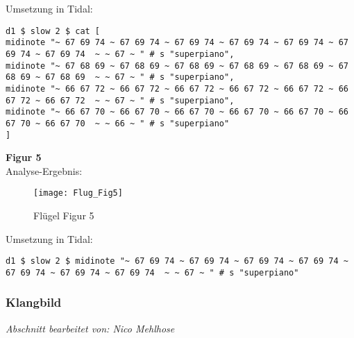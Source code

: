 \documentclass[
10pt, %
a4paper, %
oneside, %
headinclude,footinclude, %
BCOR5mm, %
]{scrartcl}
\begin{document}
\noindent Umsetzung in Tidal:
\begin{lstlisting}
d1 $ slow 2 $ cat [
midinote "~ 67 69 74 ~ 67 69 74 ~ 67 69 74 ~ 67 69 74 ~ 67 69 74 ~ 67 69 74 ~ 67 69 74  ~ ~ 67 ~ " # s "superpiano",
midinote "~ 67 68 69 ~ 67 68 69 ~ 67 68 69 ~ 67 68 69 ~ 67 68 69 ~ 67 68 69 ~ 67 68 69  ~ ~ 67 ~ " # s "superpiano",
midinote "~ 66 67 72 ~ 66 67 72 ~ 66 67 72 ~ 66 67 72 ~ 66 67 72 ~ 66 67 72 ~ 66 67 72  ~ ~ 67 ~ " # s "superpiano",
midinote "~ 66 67 70 ~ 66 67 70 ~ 66 67 70 ~ 66 67 70 ~ 66 67 70 ~ 66 67 70 ~ 66 67 70  ~ ~ 66 ~ " # s "superpiano"
]
\end{lstlisting}

\noindent \textbf{Figur 5}\\
Analyse-Ergebnis:
\begin{figure}[h]
	\centering 
	\texttt{[image: Flug\_Fig5]} 
	\caption{Flügel Figur 5}
\end{figure}

\noindent Umsetzung in Tidal:
\begin{lstlisting}
d1 $ slow 2 $ midinote "~ 67 69 74 ~ 67 69 74 ~ 67 69 74 ~ 67 69 74 ~ 67 69 74 ~ 67 69 74 ~ 67 69 74  ~ ~ 67 ~ " # s "superpiano"
\end{lstlisting}


\subsubsection{Klangbild}
\textit{Abschnitt bearbeitet von: Nico Mehlhose}\\
\end{document}
